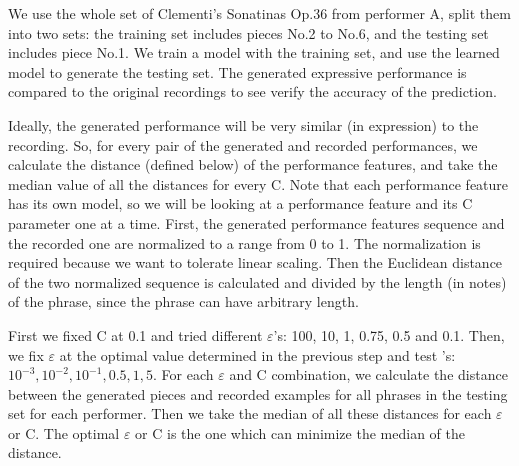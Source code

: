 We use the whole set of Clementi's Sonatinas Op.36 from performer A, split them into two sets: the training set includes pieces No.2 to No.6, and the testing set includes piece No.1. We train a model with the training set, and use the learned model to generate the testing set. The generated expressive performance is compared to the original recordings to see verify the accuracy of the prediction.



Ideally, the generated performance will be very similar (in expression) to the recording. So, for every pair of the generated and recorded performances, we calculate the distance (defined below) of the performance features, and take the median value of all the distances for every C. Note that each performance feature has its own model, so we will be looking at a performance feature and its C parameter one at a time. 
First, the generated performance features sequence and the recorded one are normalized to a range from 0 to 1. The normalization is required because we want to tolerate linear scaling. Then the Euclidean distance of the two normalized sequence is calculated and divided by the length (in notes) of the phrase, since the phrase can have arbitrary length.


First we fixed C at 0.1 and tried different $\varepsilon$'s: 100, 10, 1, 0.75, 0.5 and 0.1. Then, we fix $\varepsilon$ at the optimal value determined in the previous step and test 's: $10^{-3}, 10^{-2}, 10^{-1}, 0.5, 1, 5$. For each $\varepsilon$ and C combination, we calculate the distance between the generated pieces and recorded examples for all phrases in the testing set for each performer. Then we take the median of all these distances for each $\varepsilon$ or C. The optimal $\varepsilon$ or C is the one which can minimize the median of the distance.


